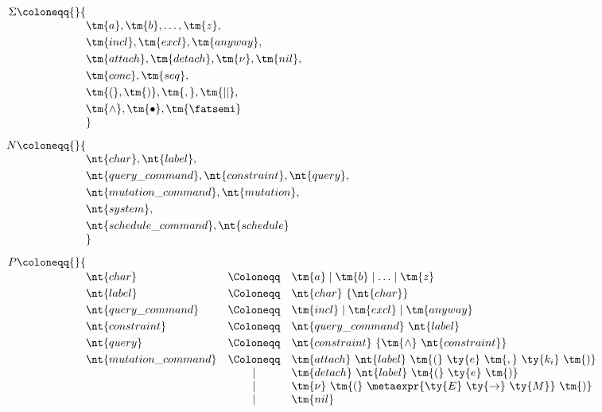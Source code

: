 \[
    \begin{alignedat}{3}
\Sigma &\coloneqq{}&
\{&
\\[-1mm]
&&&
\tm{a}, \tm{b}, \ldots, \tm{z},\\
&&&
\tm{incl}, \tm{excl}, \tm{anyway},\\
&&&
\tm{attach}, \tm{detach}, \tm{\nu}, \tm{nil},\\
&&&
\tm{conc}, \tm{seq},\\
&&&
\tm{(}, \tm{)}, \tm{,}, \tm{||},\\
&&&
\tm{\land}, \tm{\bullet}, \tm{\fatsemi}
\\[-1mm]
&&&
\}
\\[2mm]
N &\coloneqq{}&
\{&
\\[-1mm]
&&&
\nt{char}, \nt{label},\\
&&&
\nt{query\_command}, \nt{constraint}, \nt{query},\\
&&&
\nt{mutation\_command}, \nt{mutation},\\
&&&
\nt{system},\\
&&&
\nt{schedule\_command}, \nt{schedule}
\\[-1mm]
&&&
\}
\\[2mm]
P &\coloneqq{}&
\{&
\\[-1mm]
&&&
\begin{array}{@{}lcl@{}}
    \nt{char}
    &\Coloneqq&
    \tm{a} \mid \tm{b} \mid \ldots \mid \tm{z}
    \\[1mm]

    \nt{label}
    &\Coloneqq&
    \nt{char}\ \{\nt{char}\}
    \\[1mm]

    \nt{query\_command}
    &\Coloneqq&
    \tm{incl} \mid \tm{excl} \mid \tm{anyway}
    \\[1mm]

    \nt{constraint}
    &\Coloneqq&
    \nt{query\_command}\ \nt{label}
    \\[1mm]

    \nt{query}
    &\Coloneqq&
    \nt{constraint}\ \{\tm{\land}\ \nt{constraint}\}
    \\[1mm]


    \nt{mutation\_command}
    &\Coloneqq&
    \tm{attach}\ \nt{label}\ \tm{(}\ \ty{e}\ \tm{,}\ \ty{k_i}\ \tm{)}
    \\
    &\mid&
    \tm{detach}\ \nt{label}\ \tm{(}\ \ty{e}\ \tm{)}
    \\
    &\mid&
    \tm{\nu}\ \tm{(}\ \metaexpr{\ty{E}\ \ty{\rightarrow}\ \ty{M}}\ \tm{)}
    \\
    &\mid&
    \tm{nil}
    \\[1mm]


\end{array}
\end{alignedat}\]
